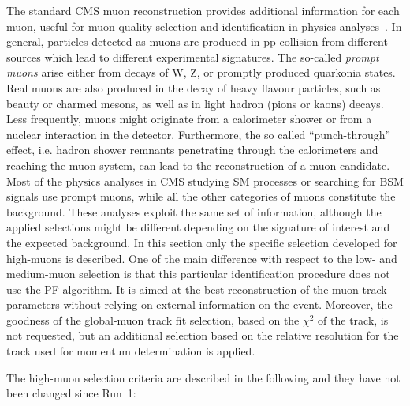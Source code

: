 The standard CMS muon reconstruction provides additional information for each muon, useful for muon quality selection and identification in physics analyses~\cite{Chatrchyan:2012xi}. 
In general, particles detected as muons are produced in pp collision from different sources which lead to different experimental signatures. The so-called \textit{prompt muons} arise either from decays of W, Z, or promptly produced quarkonia states. Real muons are also produced in the decay of heavy flavour particles, such as beauty or charmed mesons, as well as in light hadron (pions or kaons) decays. Less frequently, muons might originate from a calorimeter shower or from a nuclear interaction in the detector. Furthermore, the so called ``punch-through'' effect, i.e. hadron shower remnants penetrating through the calorimeters and reaching the muon system, can lead to the reconstruction of a muon candidate. Most of the physics analyses in CMS studying SM processes or searching for BSM signals use prompt muons, while all the other categories of muons constitute the background. These analyses exploit the same set of information, although the applied selections might be different depending on the signature of interest and the expected background. In this section only the specific selection developed for high-\pt muons is described. One of the main difference with respect to the low- and medium-\pt muon selection is that this particular identification procedure does not use the PF algorithm. It is aimed at the best reconstruction of the muon track parameters without relying on external information on the event. Moreover, the goodness of the global-muon track fit selection, based on the $\chi^2$ of the track, is not requested, but an additional selection based on the relative \pt resolution for the track used for momentum determination is applied. 

The high-\pt muon selection criteria are described in the following and they have not been changed since Run~1:


